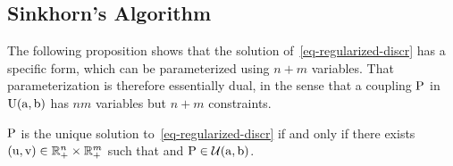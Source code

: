 






\subsection{Sinkhorn's Algorithm}

The following proposition shows that the solution of~\eqref{eq-regularized-discr} has a specific form, which can be parameterized using $n+m$ variables. That parameterization is therefore essentially dual, in the sense that a coupling $\P$ in $\CouplingsD(\a,\b)$ has $nm$ variables but $n+m$ constraints.

\begin{prop}\label{prop-regularized-primal}
$\P$ is the unique solution to~\eqref{eq-regularized-discr} if and only if there exists  $(\uD,\vD) \in \RR_+^n \times \RR_+^m$ such that 
and $\P \in \Couplings(\a,\b)$.
\end{prop} 

